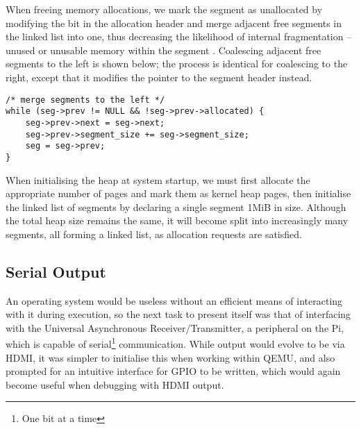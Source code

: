         When freeing memory allocations, we mark the segment as unallocated by
        modifying the bit in the allocation header and merge adjacent free
        segments in the linked list into one, thus decreasing the likelihood of
        internal fragmentation -- unused or unusable memory within the segment
        \cite[pg.~363]{DinosaurOS}. Coalescing adjacent free segments to the
        left is shown below; the process is identical for coalescing to the
        right, except that it modifies the pointer to the  segment
        header instead.
        \lstset{language=c}
        \begin{lstlisting}[caption={Coalescing heap segments to the left},captionpos=b]
/* merge segments to the left */
while (seg->prev != NULL && !seg->prev->allocated) {
    seg->prev->next = seg->next;
    seg->prev->segment_size += seg->segment_size;
    seg = seg->prev;
}
        \end{lstlisting}

        When initialising the heap at system startup, we must first allocate the
        appropriate number of pages and mark them as kernel heap pages, then
        initialise the linked list of segments by declaring a single segment
        1MiB in size. Although the total heap size remains the same, it will
        become split into increasingly many segments, all forming a linked list,
        as allocation requests are satisfied.

\subsection{Serial Output}
    \label{sec:GPIO}
    An operating system would be useless without an efficient means of
    interacting with it during execution, so the next task to present itself was
    that of interfacing with the Universal Asynchronous Receiver/Transmitter, a
    peripheral on the Pi, which is capable of serial\footnote{One bit at a time}
    communication. While output would evolve to be via HDMI, it was simpler to
    initialise this when working within QEMU, and also prompted for an intuitive
    interface for GPIO to be written, which would again become useful when
    debugging with HDMI output.

